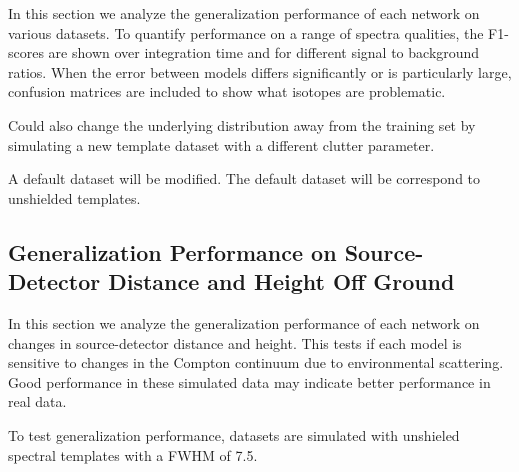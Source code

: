 In this section we analyze the generalization performance of each network on various datasets. To quantify performance on a range of spectra qualities, the F1-scores are shown over integration time and for different signal to background ratios. When the error between models differs significantly or is particularly large, confusion matrices are included to show what isotopes are problematic.

Could also change the underlying distribution away from the training set by simulating a new template dataset with a different clutter parameter.

A default dataset will be modified. The default dataset will be  correspond to unshielded templates. 

\subsection{Generalization Performance on Source-Detector Distance and Height Off Ground}

In this section we analyze the generalization performance of each network on changes in source-detector distance and height. This tests if each model is sensitive to changes in the Compton continuum due to environmental scattering. Good performance in these simulated data may indicate better performance in real data.

To test generalization performance, datasets are simulated with unshieled spectral templates with a FWHM of 7.5. 



